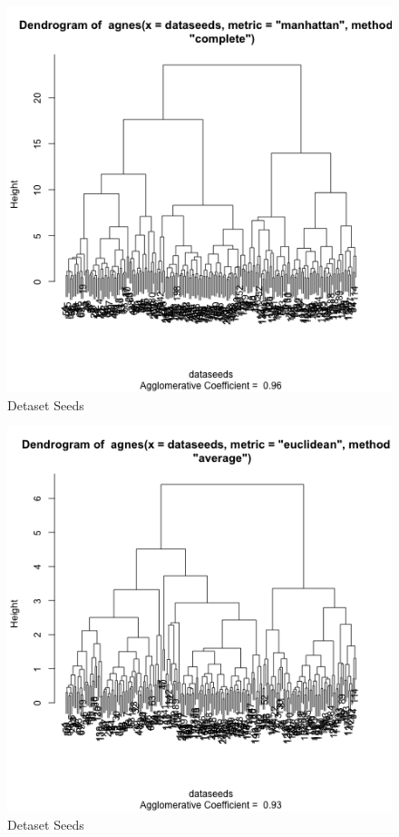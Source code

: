 \documentclass{article}
\begin{document}
\begin{figure}[ht!]
\caption{Detaset Seeds}
\centering
\includegraphics[width=1\textwidth]{plots/ang2dataseeds.png}
\end{figure}

\begin{figure}[ht!]
\caption{Detaset Seeds}
\centering
\includegraphics[width=1\textwidth]{plots/ang3dataseeds.png}
\end{figure}
\end{document}
